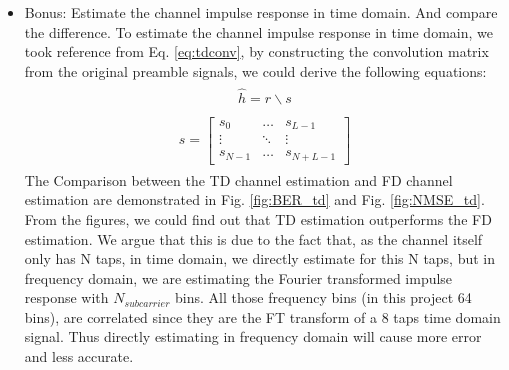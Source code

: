 \documentclass[a4paper]{article}
\begin{document}
{{\begin{itemize}
				\subitem The channel estimate accuracy is showed in Fig.\ref{fig:es_or_not}, the red line shows the performance with known channel equalization without estimation, while blue line shows the equalization with the estimated channel.
				\item Bonus: Estimate the channel impulse response in time domain. And compare the difference.
                \subitem To estimate the channel impulse response in time domain, we took reference from Eq. \ref{eq:tdconv}, by constructing the convolution matrix from the original preamble signals, we could derive the following equations:
       		\begin{align} 
				\begin{split}
					\hat{h} = r \backslash s
				\end{split}
				\label{eq:estimate_td}
			\end{align}   
            \begin{align} 
				\begin{split}
					s = \begin{bmatrix} s_0 & \ldots & s_{L-1}\\ \vdots &\ddots &\vdots \\ s_{N-1} &\ldots & s_{N+L-1}   \end{bmatrix}
				\end{split}
				\label{eq:estimate_td}
			\end{align} 
            The Comparison between the TD channel estimation and FD channel estimation are demonstrated in Fig. \ref{fig:BER_td} and Fig. \ref{fig:NMSE_td}. From the figures, we could find out that TD estimation outperforms the FD estimation. We argue that this is due to the fact that, as the channel itself only has N taps, in time domain, we directly estimate for this N taps, but in frequency domain, we are estimating the Fourier transformed impulse response with $N_{subcarrier}$ bins. All those frequency bins (in this project 64 bins), are correlated since they are the FT transform of a 8 taps time domain signal. Thus directly estimating in frequency domain will cause more error and less accurate.
            
			\end{itemize}
		}
}
	
\end{document}

